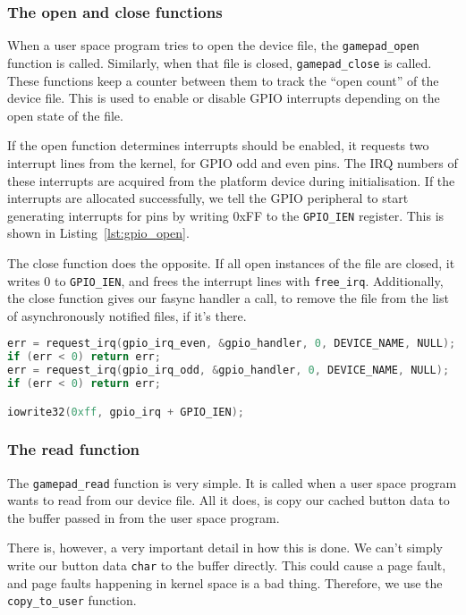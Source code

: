 \subsubsection{The open and close functions}
When a user space program tries to open the device file, the \texttt{gamepad\_open} function is called. Similarly, when that file is closed, \texttt{gamepad\_close} is called. These functions keep a counter between them to track the ``open count'' of the device file. This is used to enable or disable GPIO interrupts depending on the open state of the file.

If the open function determines interrupts should be enabled, it requests two interrupt lines from the kernel, for GPIO odd and even pins. The IRQ numbers of these interrupts are acquired from the platform device during initialisation. If the interrupts are allocated successfully, we tell the GPIO peripheral to start generating interrupts for pins by writing 0xFF to the \texttt{GPIO\_IEN} register. This is shown in Listing~\ref{lst:gpio_open}.

The close function does the opposite. If all open instances of the file are closed, it writes 0 to \texttt{GPIO\_IEN}, and frees the interrupt lines with \texttt{free\_irq}. Additionally, the close function gives our fasync handler a call, to remove the file from the list of asynchronously notified files, if it's there.

\begin{minipage}{\linewidth}
\begin{lstlisting}[language=c, label=lst:gpio_open, caption=Enabling GPIO interrupts.]
err = request_irq(gpio_irq_even, &gpio_handler, 0, DEVICE_NAME, NULL);
if (err < 0) return err;
err = request_irq(gpio_irq_odd, &gpio_handler, 0, DEVICE_NAME, NULL);
if (err < 0) return err;

iowrite32(0xff, gpio_irq + GPIO_IEN);
\end{lstlisting}
\end{minipage}

\subsubsection{The read function}
The \texttt{gamepad\_read} function is very simple. It is called when a user space program wants to read from our device file. All it does, is copy our cached button data to the buffer passed in from the user space program.

There is, however, a very important detail in how this is done. We can't simply write our button data \texttt{char} to the buffer directly. This could cause a page fault, and page faults happening in kernel space is a bad thing\cite{ldd}. Therefore, we use the \texttt{copy\_to\_user} function.

